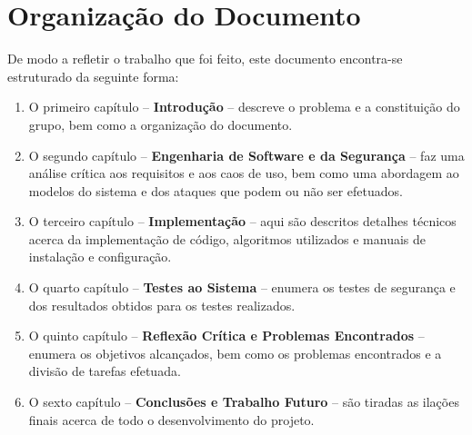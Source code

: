 \section{Organização do Documento}

De modo a refletir o trabalho que foi feito, este documento encontra-se estruturado da seguinte forma:
\begin{enumerate}
    \item O primeiro capítulo -- \textbf{Introdução} -- descreve o problema e a constituição do grupo, bem como a organização do documento.
    
    \item O segundo capítulo -- \textbf{Engenharia de Software e da Segurança} -- faz uma análise crítica aos requisitos e aos caos de uso, bem como uma abordagem ao modelos do sistema e dos ataques que podem ou não ser efetuados.
    
    \item O terceiro capítulo -- \textbf{Implementação} -- aqui são descritos detalhes técnicos acerca da implementação de código, algoritmos utilizados e manuais de instalação e configuração.
   
    \item O quarto capítulo -- \textbf{Testes ao Sistema} -- enumera os testes de segurança e dos resultados obtidos para os testes realizados.
    
    \item O quinto capítulo -- \textbf{Reflexão Crítica e Problemas Encontrados} -- enumera os objetivos alcançados, bem como os problemas encontrados e a divisão de tarefas efetuada.
    
    \item O sexto capítulo -- \textbf{Conclusões e Trabalho Futuro} -- são tiradas as ilações finais acerca de todo o desenvolvimento do projeto.
\end{enumerate}